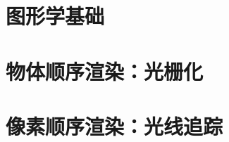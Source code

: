 \documentclass{xNoteBook}
\begin{document}
\clearpage

\tableofcontents
\listoffigures
\listoftables

\mainmatter
\nocite{*}

\part{图形学基础}








\part{物体顺序渲染：光栅化}





\part{像素顺序渲染：光线追踪}






\appendix

\backmatter



\end{document}
